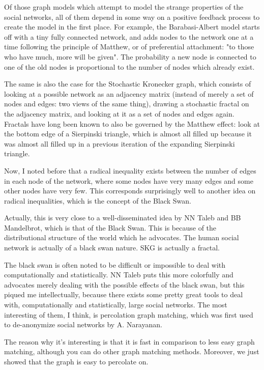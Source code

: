 \documentclass[12pt]{article}
\begin{document}
Of those graph models which attempt to model the strange properties of the social networks, all of them depend in some way on a positive feedback process to create the model in the first place. For example, the Barabasi-Albert model starts off with a tiny fully connected network, and adds nodes to the network one at a time following the principle of Matthew, or of preferential attachment: "to those who have much, more will be given". The probability a new node is connected to one of the old nodes is proportional to the number of nodes which already exist. 

The same is also the case for the Stochastic Kronecker graph, which consists of looking at a possible network as an adjacency matrix (instead of merely a set of nodes and edges: two views of the same thing), drawing a stochastic fractal on the adjacency matrix, and looking at it as a set of nodes and edges again. Fractals have long been known to also be governed by the Matthew effect: look at the bottom edge of a Sierpinski triangle, which is almost all filled up because it was almost all filled up in a previous iteration of the expanding Sierpinski triangle.

Now, I noted before that a radical inequality exists between the number of edges in each node of the network, where some nodes have very many edges and some other nodes have very few. This corresponds surprisingly well to another idea on radical inequalities, which is the concept of the Black Swan.

Actually, this is very close to a well-disseminated idea by NN Taleb and BB Mandelbrot, which is that of the Black Swan. This is because of the distributional structure of the world which he advocates. The human social network is actually of a black swan nature. SKG is actually a fractal.

The black swan is often noted to be difficult or impossible to deal with computationally and statistically. NN Taleb puts this more colorfully and advocates merely dealing with the possible effects of the black swan, but this piqued me intellectually, because there exists some pretty great tools to deal with, computationally and statistically, large social networks. The most interesting of them, I think, is percolation graph matching, which was first used to de-anonymize social networks by A. Narayanan.

The reason why it's interesting is that it is fast in comparison to less easy graph matching, although you can do other graph matching methods. Moreover, we just showed that the graph is easy to percolate on.
\end{document}
